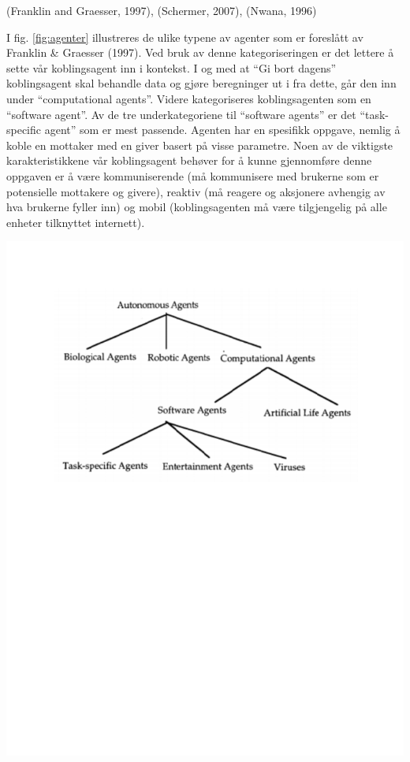 (Franklin and Graesser, 1997)\citep{agent}, (Schermer, 2007)\citep{schermer}, (Nwana, 1996)\citep{nwana}

I fig. \ref{fig:agenter} illustreres de ulike typene av agenter som er foreslått av Franklin \& Graesser (1997)\citep{agent}. Ved bruk av denne kategoriseringen er det lettere å sette vår koblingsagent inn i kontekst. I og med at ``Gi bort dagens'' koblingsagent skal behandle data og gjøre beregninger ut i fra dette, går den inn under ``computational agents''. Videre kategoriseres koblingsagenten som en ``software agent''. Av de tre underkategoriene til ``software agents'' er det ``task-specific agent'' som er mest passende. Agenten har en spesifikk oppgave, nemlig å koble en mottaker med en giver basert på visse parametre. Noen av de viktigste karakteristikkene vår koblingsagent behøver for å kunne gjennomføre denne oppgaven er å være kommuniserende (må kommunisere med brukerne som er potensielle mottakere og givere), reaktiv (må reagere og aksjonere avhengig av hva brukerne fyller inn) og mobil (koblingsagenten må være tilgjengelig på alle enheter tilknyttet internett).


\begin{center}
\includegraphics[clip=true, width=1 \textwidth,
trim=0cm 14cm 0cm 1.5cm]{agenter.pdf}
\label{fig:agenter}
\end{center}
